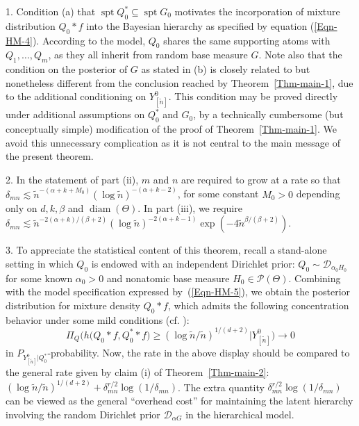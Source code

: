 \documentclass[MSNbibl,number,citesort]{arxbj}
\newcommand{\eqref}[1]{(\ref{#1})}
\newcommand{\Pcal}{\mathscr{P}}
\newcommand{\supp}{\operatorname{spt}}
\newcommand{\DP}{\mathscr{D}}
\newcommand{\delmn}{\delta_{mn}}
\newcommand{\nn}{\tilde{n}}
\begin{document}
\begin{remarks*}
%
%
1. Condition (a) that $\supp Q_0^*\subseteq\supp G_0$
motivates the incorporation of mixture distribution
$Q_0*f$ into the Bayesian hierarchy\vadjust{\goodbreak} as specified by equation \eqref{Eqn-HM-4}.
According to the model,
$Q_0$ shares the same supporting atoms
with $Q_1,\ldots, Q_m$, as they all inherit from random base measure $G$.
Note also that the condition on the posterior of $G$ as
stated in (b) is closely related to but nonetheless different from the
conclusion reached
by Theorem~\ref{Thm-main-1}, due to the additional conditioning
on $Y_{[\nn]}^0$. This condition may be proved directly under
additional assumptions on $Q_0^*$ and $G_0$, by a technically cumbersome
(but conceptually simple) modification
of the proof of Theorem~\ref{Thm-main-1}. We avoid this unnecessary
complication
as it is not central to the main
message of the present theorem. %

2. In the statement of part (ii), $m$ and $n$ are required to grow
at a rate so that
$\delmn\lesssim\nn^{-(\alpha+k+M_0)} (\log\nn)^{-(\alpha+k-2)}$,
for some constant $M_0 > 0$ depending only on $d,k,\beta$ and
$\operatorname{diam}
(\Theta)$.
In part (iii), we require
$\delmn\lesssim\nn^{-2(\alpha+k)/(\beta+2)} (\log\nn)^{-2(\alpha+k-1)}
\exp(-4\nn^{\beta/(\beta+2)})$.

3. To appreciate the statistical content of this theorem, recall
a stand-alone setting in which $Q_0$
is endowed with an independent Dirichlet prior: $Q_0\sim\DP_{\alpha_0
H_0}$ for
some known $\alpha_0 > 0$ and nonatomic base measure $H_0 \in\Pcal
(\Theta)$.
Combining with the model specification expressed by~\eqref{Eqn-HM-5}, we
obtain the posterior distribution for mixture density $Q_0*f$,
which admits the following concentration behavior under some mild
conditions (cf. \cite{Nguyen-11}): %
%
%
\begin{equation}
\Pi_Q \bigl(h\bigl(Q_0*f,Q_0^**f
\bigr)\geq(\log\nn/ \nn)^{{1}/{(d+2)}} | Y_{[\nn]}^0 \bigr)
\longrightarrow0
\end{equation}
%
in $P_{Y^0_{[\nn]}|Q_0^*}$-probability.\vspace*{-1pt}
%
Now, the rate in the above display
should be compared to the general rate given by claim (i)
of Theorem~\ref{Thm-main-2}:
$(\log\nn/\nn)^{1/(d+2)} +
\delmn^{r/2}\log(1/\delmn)$.
The extra quantity $\delmn^{r/2}\log(1/\delmn)$ can be viewed
as the general ``overhead cost'' for maintaining the
latent hierarchy involving the random Dirichlet prior $\DP_{\alpha G}$
in the hierarchical model.


\end{remarks*}
\end{document}
